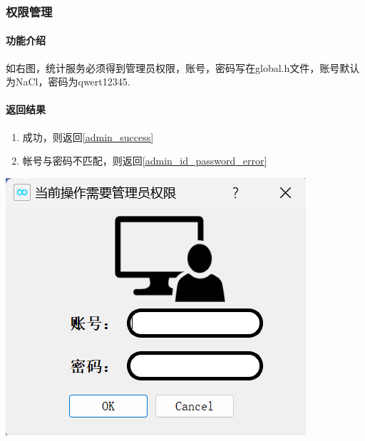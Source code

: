 \documentclass{article}
\begin{document}
    \subsubsection{权限管理}
    \begin{minipage}[h]{0.5\linewidth}
        \paragraph{功能介绍}
        如右图，统计服务必须得到管理员权限，账号，密码写在global.h文件，账号默认为NaCl，密码为qwert12345.
        \vfill
        \paragraph{返回结果}
        \begin{enumerate}
            \item 成功，则返回\ref{admin_success}
            \item 帐号与密码不匹配，则返回\ref{admin_id_password_error}
        \end{enumerate}
    \end{minipage}
    \begin{minipage}[h]{0.45\linewidth}
        \centering
        \includegraphics[scale=0.6]{figure/admin.png}
        \label{admin}
    \end{minipage}
\end{document}
